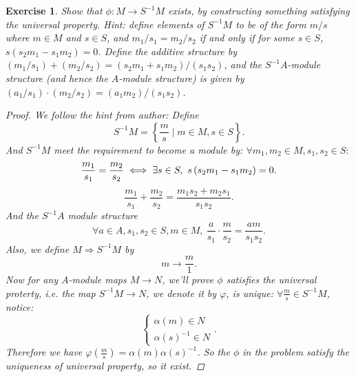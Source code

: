 \documentclass{article}
\theoremstyle{breakstyle}
\newtheorem{exercise}{Exercise}[section]
\begin{document}
\begin{exercise}
Show that $\phi \colon M \to S^{-1}M$ exists, by constructing something
satisfying the universal property. Hint: define elements of $S^{-1}M$ to be
of the form $m/s$ where $m \in M$ and $s \in S$, and $m_1/s_1 = m_2/s_2$ if
and only if for some $s \in S$, $s(s_2m_1 - s_1m_2) = 0$. Define the
additive structure by $(m_1/s_1) + (m_2/s_2) = (s_2m_1 + s_1m_2)/(s_1s_2)$,
and the $S^{-1}A$-module structure (and hence the $A$-module structure) is
given by $(a_1/s_1) \cdot (m_2/s_2) = (a_1m_2)/(s_1s_2)$.

\begin{proof}
	We follow the hint from author: Define
	$$
	S^{-1}M= \left\{ \frac{m}{s}\mid m \in M,s \in S \right\} 
	.$$ 
    And $S^{-1}M$ meet the requirement to become a module by: $\forall
    m_{1},m_{2}\in M,s_{1},s_{2}\in S:$
	$$
	\frac{m_{1}}{s_{1}} = \frac{m_{2}}{s_{2}} \iff \exists s \in S,\ s \left( s_{2}m_{1}-s_{1}m_{2} \right) =0\\
	.$$ 
	$$
    \frac{m_{1}}{s_{1}} + \frac{m_{2}}{s_{2}}
     = \frac{m_{1}s_{2}+m_{2}s_{1}}{s_{1}s_{2}}
	.$$ 
	And the $S^{-1}A$ module structure
	$$
    \forall a \in A,s_{1},s_{2}\in S,m\in M,\ \frac{a}{s_{1}}\cdot
    \frac{m}{s_{2}} = \frac{am}{s_{1}s_{2}}
	.$$ 
	Also, we define $M\Rightarrow S^{-1}M$ by
	$$
	m \longrightarrow \frac{m}{1}
	.$$ 
    Now for any $A$-module maps $M\rightarrow N$, we'll prove $\phi$ satisfies
    the universal proterty, i.e. the map $S^{-1}M\longrightarrow N$, we denote
    it by $\varphi$, is unique: $\forall \frac{m}{s}\in S^{-1}M$, notice:
	$$
	\begin{cases}
		\alpha(m) \in N \\
		\alpha(s)^{-1} \in N
	\end{cases}
	.$$ 
    Therefore we have $\varphi( \frac{m}{s} ) = \alpha(m) \alpha(s)^{-1}$. So
    the $\phi$ in the problem satisfy the uniqueness of universal property, so
    it exist.
\end{proof}

\end{exercise}
\end{document}
